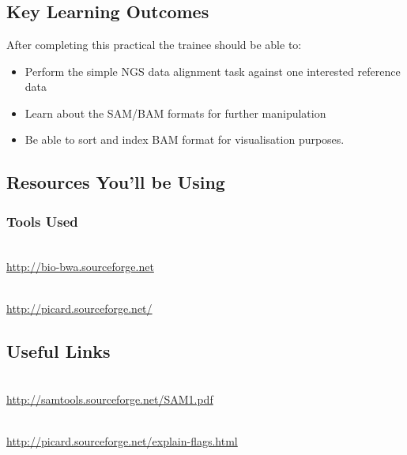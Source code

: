 
\setModuleContributions{%
}

\chapter{\moduleTitle}
\newpage

\section{Key Learning Outcomes}

After completing this practical the trainee should be able to:
\begin{itemize}
  \item Perform the simple NGS data alignment task against one interested reference data
  \item Learn about the SAM/BAM formats for further manipulation 
  \item Be able to sort and index BAM format for visualisation purposes.
\end{itemize}

\section{Resources You'll be Using}
 
\subsection{Tools Used}
\begin{description}[style=multiline,labelindent=0cm,align=left,leftmargin=0.5cm]
  \item[BWA Burrow Wheel Algorithm]\hfill\\
  	\url{http://bio-bwa.sourceforge.net}
  \item[Samtools]\hfill\\
  	\url{http://picard.sourceforge.net/}
\end{description}

\section{Useful Links}
 
\begin{description}[style=multiline,labelindent=0cm,align=left,leftmargin=0.5cm]
  \item[SAM Specification]\hfill\\
    \url{http://samtools.sourceforge.net/SAM1.pdf}
  \item[Explain SAM Flags]\hfill\\
    \url{http://picard.sourceforge.net/explain-flags.html}
\end{description}

